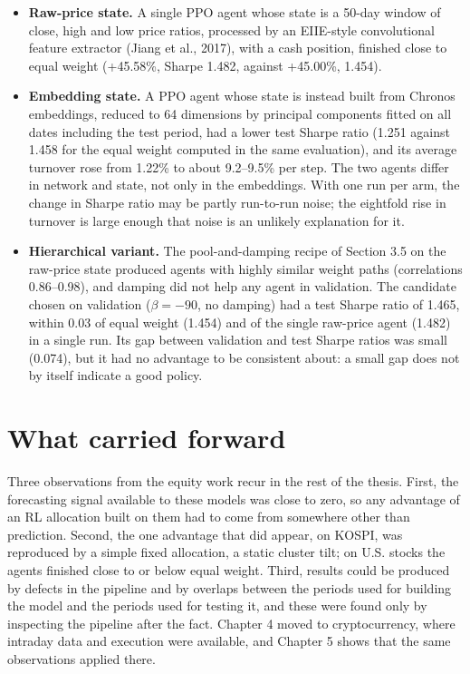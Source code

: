 \documentclass[12pt,a4paper]{report}
\providecommand{\tightlist}{\setlength{\itemsep}{0pt}\setlength{\parskip}{0pt}}
\begin{document}
\begin{itemize}
\tightlist
\item
  \textbf{Raw-price state.} A single PPO agent whose state is a 50-day
  window of close, high and low price ratios, processed by an EIIE-style
  convolutional feature extractor (Jiang et al., 2017), with a cash
  position, finished close to equal weight (+45.58\%, Sharpe 1.482,
  against +45.00\%, 1.454).
\item
  \textbf{Embedding state.} A PPO agent whose state is instead built
  from Chronos embeddings, reduced to 64 dimensions by principal
  components fitted on all dates including the test period, had a lower
  test Sharpe ratio (1.251 against 1.458 for the equal weight computed
  in the same evaluation), and its average turnover rose from 1.22\% to
  about 9.2--9.5\% per step. The two agents differ in network and state,
  not only in the embeddings. With one run per arm, the change in Sharpe
  ratio may be partly run-to-run noise; the eightfold rise in turnover
  is large enough that noise is an unlikely explanation for it.
\item
  \textbf{Hierarchical variant.} The pool-and-damping recipe of Section
  3.5 on the raw-price state produced agents with highly similar weight
  paths (correlations 0.86--0.98), and damping did not help any agent in
  validation. The candidate chosen on validation (\(\beta = -90\), no
  damping) had a test Sharpe ratio of 1.465, within 0.03 of equal weight
  (1.454) and of the single raw-price agent (1.482) in a single run. Its
  gap between validation and test Sharpe ratios was small (0.074), but
  it had no advantage to be consistent about: a small gap does not by
  itself indicate a good policy.
\end{itemize}

\section{What carried forward}\label{what-carried-forward}

Three observations from the equity work recur in the rest of the thesis.
First, the forecasting signal available to these models was close to
zero, so any advantage of an RL allocation built on them had to come
from somewhere other than prediction. Second, the one advantage that did
appear, on KOSPI, was reproduced by a simple fixed allocation, a static
cluster tilt; on U.S. stocks the agents finished close to or below equal
weight. Third, results could be produced by defects in the pipeline and
by overlaps between the periods used for building the model and the
periods used for testing it, and these were found only by inspecting the
pipeline after the fact. Chapter 4 moved to cryptocurrency, where
intraday data and execution were available, and Chapter 5 shows that the
same observations applied there.
\end{document}
